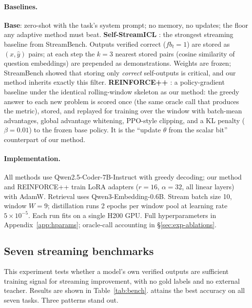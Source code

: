 \paragraph{Baselines.} \textbf{Base}: zero-shot with the task's system prompt; no
memory, no updates; the floor any adaptive method must beat. \textbf{Self-StreamICL}
\citep{wu2024streambench}: the strongest streaming baseline from StreamBench.
Outputs verified correct ($fb_t{=}1$) are stored as $(x, \hat y)$ pairs; at each
step the $k{=}3$ nearest stored pairs (cosine similarity of question embeddings)
are prepended as demonstrations. Weights are frozen; StreamBench showed that
storing only \emph{correct} self-outputs is critical, and our method inherits
exactly this filter. \textbf{REINFORCE++} \citep{hu2025reinforcepp}: a
policy-gradient baseline under the identical rolling-window skeleton as our
method: the greedy answer to each new problem is scored once (the same oracle
call that produces the metric), stored, and replayed for training over the
window with batch-mean advantages, global advantage whitening, PPO-style
clipping, and a KL penalty ($\beta{=}0.01$) to the frozen base policy. It is the
``update $\theta$ from the scalar bit'' counterpart of our method.

\paragraph{Implementation.} All methods use Qwen2.5-Coder-7B-Instruct
\citep{hui2024qwen25coder} with greedy decoding; our method and REINFORCE++
train LoRA adapters \citep{hu2022lora} ($r{=}16$, $\alpha{=}32$, all linear
layers) with AdamW. Retrieval uses Qwen3-Embedding-0.6B. Stream batch size 10,
window $W{=}9$; distillation runs 2 epochs per window pool at learning rate
$5{\times}10^{-5}$. Each run fits on a single H200 GPU. Full hyperparameters in
Appendix~\ref{app:hparams}; oracle-call accounting in \S\ref{sec:exp-ablations}.

\subsection{Seven streaming benchmarks}
\label{sec:exp-bench}

This experiment tests whether a model's own verified outputs are sufficient
training signal for streaming improvement, with no gold labels and no external
teacher. Results are shown in Table~\ref{tab:bench}. \method{} attains the
best accuracy on all seven tasks. Three patterns stand out.

